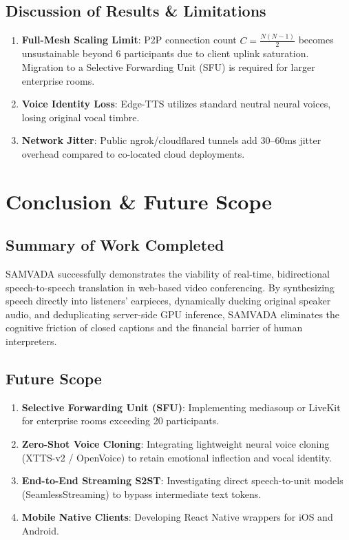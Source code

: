 \documentclass[12pt,a4paper]{report}
\begin{document}
\section{Discussion of Results \& Limitations}
\begin{enumerate}
    \item \textbf{Full-Mesh Scaling Limit}: P2P connection count $C = \frac{N(N-1)}{2}$ becomes unsustainable beyond 6 participants due to client uplink saturation. Migration to a Selective Forwarding Unit (SFU) is required for larger enterprise rooms.
    \item \textbf{Voice Identity Loss}: Edge-TTS utilizes standard neutral neural voices, losing original vocal timbre.
    \item \textbf{Network Jitter}: Public ngrok/cloudflared tunnels add 30--60ms jitter overhead compared to co-located cloud deployments.
\end{enumerate}

\chapter{Conclusion \& Future Scope}

\section{Summary of Work Completed}
SAMVADA successfully demonstrates the viability of real-time, bidirectional speech-to-speech translation in web-based video conferencing. By synthesizing speech directly into listeners' earpieces, dynamically ducking original speaker audio, and deduplicating server-side GPU inference, SAMVADA eliminates the cognitive friction of closed captions and the financial barrier of human interpreters.

\section{Future Scope}
\begin{enumerate}
    \item \textbf{Selective Forwarding Unit (SFU)}: Implementing mediasoup or LiveKit for enterprise rooms exceeding 20 participants.
    \item \textbf{Zero-Shot Voice Cloning}: Integrating lightweight neural voice cloning (XTTS-v2 / OpenVoice) to retain emotional inflection and vocal identity.
    \item \textbf{End-to-End Streaming S2ST}: Investigating direct speech-to-unit models (SeamlessStreaming) to bypass intermediate text tokens.
    \item \textbf{Mobile Native Clients}: Developing React Native wrappers for iOS and Android.
\end{enumerate}
\end{document}

